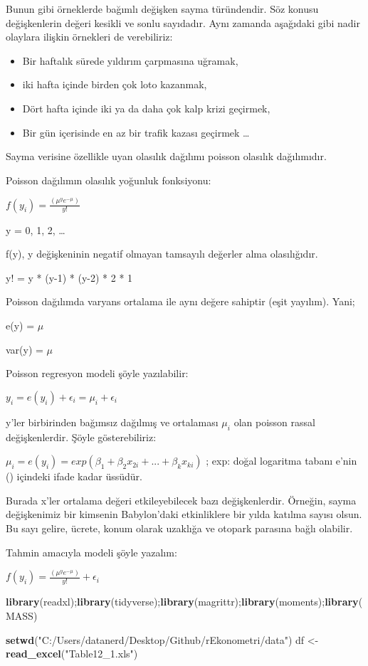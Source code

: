 \documentclass[
]{book}
\newenvironment{Shaded}{\begin{snugshade}}{\end{snugshade}}
\newcommand{\KeywordTok}[1]{\textcolor[rgb]{0.13,0.29,0.53}{\textbf{#1}}}
\newcommand{\NormalTok}[1]{#1}
\newcommand{\StringTok}[1]{\textcolor[rgb]{0.31,0.60,0.02}{#1}}
\begin{document}
Bunun gibi örneklerde bağımlı değişken sayma türündendir. Söz konusu değişkenlerin değeri kesikli ve sonlu sayıdadır. Aynı zamanda aşağıdaki gibi nadir olaylara ilişkin örnekleri de verebiliriz:

\begin{itemize}
\item
  Bir haftalık sürede yıldırım çarpmasına uğramak,
\item
  iki hafta içinde birden çok loto kazanmak,
\item
  Dört hafta içinde iki ya da daha çok kalp krizi geçirmek,
\item
  Bir gün içerisinde en az bir trafik kazası geçirmek \ldots{}
\end{itemize}

Sayma verisine özellikle uyan olasılık dağılımı poisson olasılık dağılımıdır.

Poisson dağılımın olasılık yoğunluk fonksiyonu:

\(f(y_i) = \frac{(\mu^ye^{-\mu})}{y!}\)

y = 0, 1, 2, \ldots{}

f(y), y değişkeninin negatif olmayan tamsayılı değerler alma olasılığıdır.

y! = y * (y-1) * (y-2) * 2 * 1

Poisson dağılımda varyans ortalama ile aynı değere sahiptir (eşit yayılım). Yani;

e(y) = \(\mu\)

var(y) = \(\mu\)

Poisson regresyon modeli şöyle yazılabilir:

\(y_i = e(y_i) + \epsilon_i = \mu_i + \epsilon_i\)

y'ler birbirinden bağımsız dağılmış ve ortalaması \(\mu_i\) olan poisson rassal değişkenlerdir. Şöyle gösterebiliriz:

\(\mu_i = e(y_i) = exp(\beta_1 + \beta_2x_{2i} + ... + \beta_kx_{ki})\) ; exp: doğal logaritma tabanı e'nin () içindeki ifade kadar üssüdür.

Burada x'ler ortalama değeri etkileyebilecek bazı değişkenlerdir. Örneğin, sayma değişkenimiz bir kimsenin Babylon'daki etkinliklere bir yılda katılma sayısı olsun. Bu sayı gelire, ücrete, konum olarak uzaklığa ve otopark parasına bağlı olabilir.

Tahmin amacıyla modeli şöyle yazalım:

\(f(y_i) = \frac{(\mu^ye^{-\mu})}{y!} + \epsilon_i\)

\begin{Shaded}
\begin{Highlighting}[]
\KeywordTok{library}\NormalTok{(readxl);}\KeywordTok{library}\NormalTok{(tidyverse);}\KeywordTok{library}\NormalTok{(magrittr);}\KeywordTok{library}\NormalTok{(moments);}\KeywordTok{library}\NormalTok{(MASS)}

\KeywordTok{setwd}\NormalTok{(}\StringTok{"C:/Users/datanerd/Desktop/Github/rEkonometri/data"}\NormalTok{)}
\NormalTok{df <-}\StringTok{ }\KeywordTok{read_excel}\NormalTok{(}\StringTok{"Table12_1.xls"}\NormalTok{)}
\end{Highlighting}
\end{Shaded}
\end{document}
